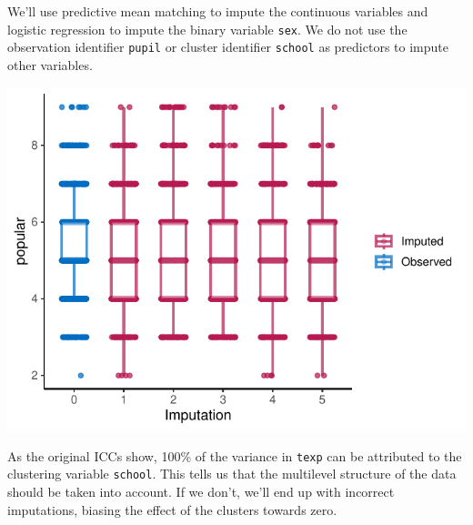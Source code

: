 \documentclass[
]{jss}
\begin{document}
We'll use predictive mean matching to impute the continuous variables
and logistic regression to impute the binary variable \texttt{sex}. We
do not use the observation identifier \texttt{pupil} or cluster
identifier \texttt{school} as predictors to impute other variables.

\begin{CodeChunk}
\end{CodeChunk}

\begin{CodeChunk}


\begin{center}\includegraphics{Imputation_of_Incomplete_Multilevel_Data_files/figure-latex/pop_ignored_eval-1} \end{center}

\end{CodeChunk}

As the original ICCs show, 100\% of the variance in \texttt{texp} can be
attributed to the clustering variable \texttt{school}. This tells us
that the multilevel structure of the data should be taken into account.
If we don't, we'll end up with incorrect imputations, biasing the effect
of the clusters towards zero.
\end{document}
